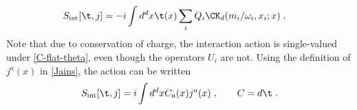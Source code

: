 \documentclass[11pt]{article}
\def\o{{\omega}}
\begin{document}
\begin{equation}
\begin{split}\label{Sintabelian}
S_{\text{int}} [ \t , j ]  &= - i \int d^d x \t(x) \sum_i Q_i \CK_d ( m_i / \o_i , x_i ; x )  \; .
\end{split}
\end{equation}
Note that due to conservation of charge, the interaction action is single-valued under \eqref{C-flat-theta}, even though the operators $U_i$ are not. Using the definition of $j^a(x)$ in \eqref{Jains}, the action can be written 
\begin{equation}
\begin{split}
S_{\text{int}} [ \t , j ]  &=  i \int d^d x C_a (x)   j^a(x) \; , \qquad C = d \t  \; . \\
\end{split}
\end{equation}
\end{document}
